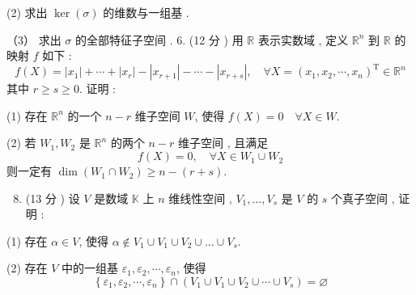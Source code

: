 \documentclass[10pt]{article}
\begin{document}
(2)  求出  $\operatorname{ker}(\sigma)$  的维数与一组基 .

（3） 求出  $\sigma$  的全部特征子空间 . 6. (12  分 )  用  $\mathbb{R}$  表示实数域 ,  定义  $\mathbb{R}^{n}$  到  $\mathbb{R}$  的映射  $f$  如下 :
$$
f(X)=\left|x_{1}\right|+\cdots+\left|x_{r}\right|-\left|x_{r+1}\right|-\cdots-\left|x_{r+s}\right|, \quad \forall X=\left(x_{1}, x_{2}, \cdots, x_{n}\right)^{\mathrm{T}} \in \mathbb{R}^{n}
$$
 其中  $r \geqslant s \geqslant 0$.  证明 :

(1)  存在  $\mathbb{R}^{n}$  的一个  $n-r$  维子空间  $W$,  使得  $f(X)=0 \quad \forall X \in W$.

(2)  若  $W_{1}, W_{2}$  是  $\mathbb{R}^{n}$  的两个  $n-r$  维子空间 ,  且满足 
$$
f(X)=0, \quad \forall X \in W_{1} \cup W_{2}
$$
 则一定有  $\operatorname{dim}\left(W_{1} \cap W_{2}\right) \geqslant n-(r+s)$.

\begin{enumerate}
  \setcounter{enumi}{7}
  \item (13  分 )  设  $V$  是数域  $\mathbb{K}$  上  $n$  维线性空间 , $V_{1}, \ldots, V_{s}$  是  $V$  的  $s$  个真子空间 ,  证明 :
\end{enumerate}
(1)  存在  $\alpha \in V$,  使得  $\alpha \notin V_{1} \cup V_{1} \cup V_{2} \cup \ldots \cup V_{s}$.

(2)  存在  $V$  中的一组基  $\varepsilon_{1}, \varepsilon_{2}, \cdots, \varepsilon_{n}$,  使得 
$$
\left\{\varepsilon_{1}, \varepsilon_{2}, \cdots, \varepsilon_{n}\right\} \cap\left(V_{1} \cup V_{1} \cup V_{2} \cup \cdots \cup V_{s}\right)=\varnothing
$$
\end{document}
